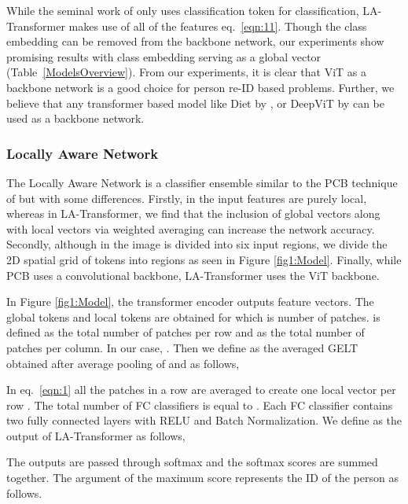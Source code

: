 \documentclass{article}
\begin{document}
While the seminal work of \citet{ViT} only uses classification token  for classification, LA-Transformer makes use of all of the features  eq.~\ref{eqn:11}. Though the class embedding can be removed from the backbone network, our experiments show promising results with class embedding serving as a global vector (Table~\ref{ModelsOverview}). From our experiments, it is clear that ViT as a backbone network is a good choice for person re-ID based problems. Further, we believe that any transformer based model like Diet by \citet{Deit}, or DeepViT by \citet{DeepViT} can be used as a backbone network.

\subsubsection{Locally Aware Network}\label{part2}

The Locally Aware Network is a classifier ensemble similar to the PCB technique of \citet{PCB} but with some differences. Firstly, in \citet{PCB} the input features are purely local, whereas in LA-Transformer, we find that the inclusion of global vectors along with local vectors via weighted averaging can increase the network accuracy.  Secondly, although in \citet{PCB} the image is divided into six input regions, we divide the 2D spatial grid of tokens into  regions as seen in Figure \ref{fig1:Model}.  Finally, while PCB uses a convolutional backbone, LA-Transformer uses the ViT backbone.

In Figure \ref{fig1:Model}, the transformer encoder outputs  feature vectors. The global tokens  and local tokens  are obtained for which  is number of patches.  is defined as the total number of patches per row and  as the total number of patches per column. In our case, . Then we define  as the averaged GELT obtained after average pooling of  and  as follows,



In eq.~\ref{eqn:1} all the patches in a row are averaged to create one local vector per row . The total number of FC classifiers is equal to . Each FC classifier contains two fully connected layers with RELU and Batch Normalization. We define  as the output of LA-Transformer as follows,



The outputs  are passed through softmax and the softmax scores are summed together. The argument of the maximum score represents the ID of the person as follows.
\end{document}
